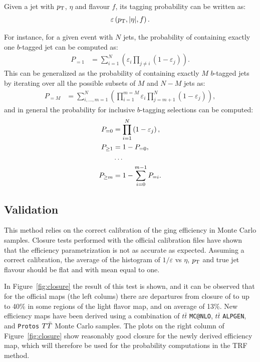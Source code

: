 Given a jet with $\pt$, $\eta$ and flavour $f$, its 
tagging probability can be written as:
\begin{equation}
	\varepsilon \left(\pt,|\eta|,f\right).
\end{equation}

For instance, for a given event with $N$ jets, the probability of 
containing exactly one $b$-tagged jet can be computed as:
\begin{align}
	P_{=1} &= \sum\limits_{i=1}^N \left( \varepsilon_{i} \prod\limits_{j \neq i} \left( 1 - \varepsilon_{j} \right) \right).\end{align}
This can be generalized as the probability of containing exactly $M$
$b$-tagged jets by iterating over all the possible subsets of $M$ and $N-M$
jets as:
\begin{align}
        P_{=M} &= \sum\limits_{i,\dots,m=1}^N 
        \left( 
        \prod\limits_{i=1}^{m=M} \varepsilon_{i}  
        \prod\limits_{j=m+1}^N \left( 1 - \varepsilon_{j} \right) 
        \right),
\end{align}
and in general the probability for inclusive $b$-tagging selections can be
computed:
\begin{align}
	P_{=0} &= \prod\limits_{i=1}^N \left( 1 - \varepsilon_{j} \right), \\
	P_{\geq 1} &= 1 - P_{=0},\\
&\dots \notag\\
	P_{\geq m} &= 1 - \sum\limits_{i=0}^{m-1} P_{=i}.
\end{align}

\subsection{Validation}
This method relies on the correct calibration of the \btag ging efficiency in 
Monte Carlo samples. 
Closure tests performed with the official calibration files have shown that 
the efficiency parametrization is not as accurate as expected.
Assuming a correct calibration, the average of the histogram of 
$1/\varepsilon$ vs $\eta$, $\pt$ and true jet flavour should be 
flat and with mean equal to one.

In Figure~\ref{fig:closure} the result of this test is shown, and it 
can be observed that for the official maps (the left colums) there 
are departures from closure of to up to 40\% in some regions of the light flavor
map, and on average of 13\%.
New efficiency maps have been derived using a combination 
of $t\bar{t}$ \texttt{MC@NLO}, $t\bar{t}$ \texttt{ALPGEN}, and 
\texttt{Protos} $\TT$ Monte Carlo samples.
The plots on the right column of Figure~\ref{fig:closure} 
show reasonably good closure for the newly derived efficiency map,
which will therefore be used for the probability computations in the TRF method.

